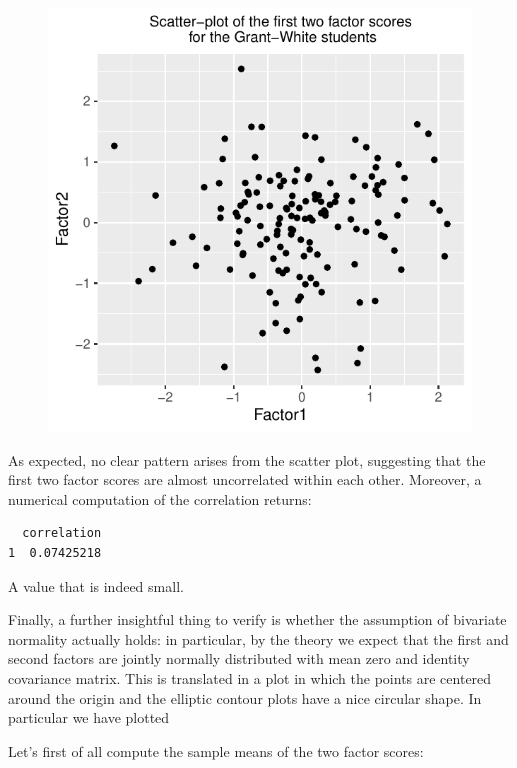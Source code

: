 \documentclass[
  letterpaper,
  DIV=11,
  numbers=noendperiod]{scrartcl}
\begin{document}
\begin{figure}[H]

{\centering \includegraphics{ProblemSet2_files/figure-pdf/unnamed-chunk-35-1.pdf}

}

\end{figure}

As expected, no clear pattern arises from the scatter plot, suggesting
that the first two factor scores are almost uncorrelated within each
other. Moreover, a numerical computation of the correlation returns:

\begin{verbatim}
  correlation
1  0.07425218
\end{verbatim}

A value that is indeed small.

Finally, a further insightful thing to verify is whether the assumption
of bivariate normality actually holds: in particular, by the theory we
expect that the first and second factors are jointly normally
distributed with mean zero and identity covariance matrix. This is
translated in a plot in which the points are centered around the origin
and the elliptic contour plots have a nice circular shape. In particular
we have plotted

Let's first of all compute the sample means of the two factor scores:
\end{document}
